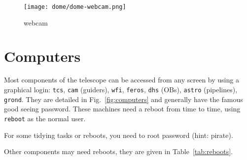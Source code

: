 \documentclass[11pt,fleqn]{book} %
\begin{document}
\begin{figure}[!ht]
\centering
  \texttt{[image: dome/dome-webcam.png]}%
\caption{\gls{webcam}}
\label{fig:webcam}
\end{figure}

\section{Computers}
Most components of the telescope can be accessed from any screen by using a graphical login: \texttt{tcs}, \texttt{cam} (guiders), \texttt{wfi}, \texttt{feros}, \texttt{dhs} (OBs), \texttt{astro} (pipelines), \texttt{grond}.  They are detailed in Fig.~\ref{fig:computers} and generally have the famous good seeing password. These machines need a reboot from time to time, using \texttt{reboot} as the normal user. 

For some tidying tasks or reboots, you need to root password (hint: pirate). 

Other components may need reboots, they are given in Table~\ref{tab:reboots}. 
\end{document}
